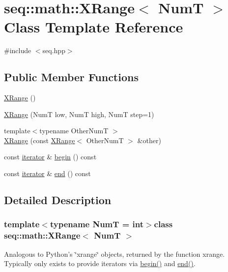 \hypertarget{classseq_1_1math_1_1_x_range}{\section{seq\-:\-:math\-:\-:X\-Range$<$ Num\-T $>$ Class Template Reference}
\label{classseq_1_1math_1_1_x_range}
}


{\ttfamily \#include $<$seq.\-hpp$>$}

\subsection*{Public Member Functions}
\begin{DoxyCompactItemize}
\item 
\hyperlink{classseq_1_1math_1_1_x_range_aa3b9c544a4c740bc0a9dee803bbde3a8}{X\-Range} ()
\item 
\hyperlink{classseq_1_1math_1_1_x_range_ab96ca4e1cb77c57b49bee3071b027f4b}{X\-Range} (Num\-T low, Num\-T high, Num\-T step=1)
\item 
{\footnotesize template$<$typename Other\-Num\-T $>$ }\\\hyperlink{classseq_1_1math_1_1_x_range_aec92a32c748822f6aeb1935e045f4eb3}{X\-Range} (const \hyperlink{classseq_1_1math_1_1_x_range}{X\-Range}$<$ Other\-Num\-T $>$ \&other)
\item 
const \hyperlink{classseq_1_1math_1_1_x_range_iterator}{iterator} \& \hyperlink{classseq_1_1math_1_1_x_range_a231541cb2a2f68811f3bb96ea14689bf}{begin} () const 
\item 
const \hyperlink{classseq_1_1math_1_1_x_range_iterator}{iterator} \& \hyperlink{classseq_1_1math_1_1_x_range_afe800d3e48413221a54ff54bfcf14206}{end} () const 
\end{DoxyCompactItemize}


\subsection{Detailed Description}
\subsubsection*{template$<$typename Num\-T = int$>$class seq\-::math\-::\-X\-Range$<$ Num\-T $>$}

Analogous to Python's \char`\"{}xrange\char`\"{} objects, returned by the function {\ttfamily xrange}. Typically only exists to provide iterators via {\ttfamily \hyperlink{classseq_1_1math_1_1_x_range_a231541cb2a2f68811f3bb96ea14689bf}{begin()}} and {\ttfamily \hyperlink{classseq_1_1math_1_1_x_range_afe800d3e48413221a54ff54bfcf14206}{end()}}. 

